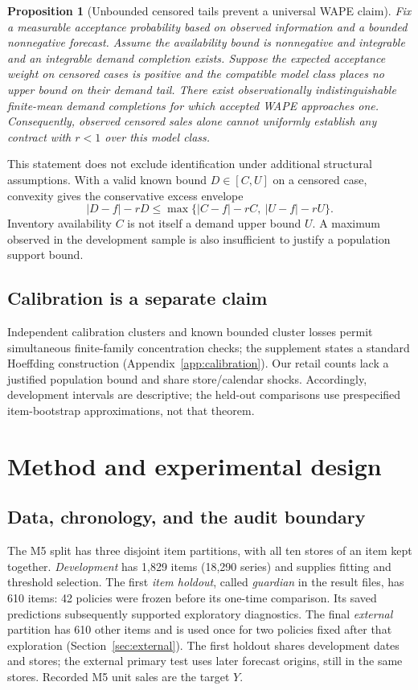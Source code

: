 \documentclass{article}
\newtheorem{proposition}{Proposition}
\begin{document}
\begin{proposition}[Unbounded censored tails prevent a universal WAPE claim]
\label{prop:identification}
Fix a measurable acceptance probability based on observed information and a bounded nonnegative forecast. Assume the availability bound is nonnegative and integrable and an integrable demand completion exists. Suppose the expected acceptance weight on censored cases is positive and the compatible model class places no upper bound on their demand tail. There exist observationally indistinguishable finite-mean demand completions for which accepted WAPE approaches one. Consequently, observed censored sales alone cannot uniformly establish any contract with $r<1$ over this model class.
\end{proposition}
This statement does not exclude identification under additional structural assumptions. With a valid known bound $D\in[C,U]$ on a censored case, convexity gives the conservative excess envelope
\begin{equation}
 |D-f|-rD \leq
 \max\{|C-f|-rC,\ |U-f|-rU\}.
 \label{eq:envelope}
\end{equation}
Inventory availability $C$ is not itself a demand upper bound $U$. A maximum observed in the development sample is also insufficient to justify a population support bound.

\subsection{Calibration is a separate claim}
\label{sec:calibration}
Independent calibration clusters and known bounded cluster losses permit simultaneous finite-family concentration checks; the supplement states a standard Hoeffding construction (Appendix~\ref{app:calibration}). Our retail counts lack a justified population bound and share store/calendar shocks. Accordingly, development intervals are descriptive; the held-out comparisons use prespecified item-bootstrap approximations, not that theorem.

\section{Method and experimental design}
\subsection{Data, chronology, and the audit boundary}
The M5 split has three disjoint item partitions, with all ten stores of an item kept together. \emph{Development} has 1,829 items (18,290 series) and supplies fitting and threshold selection. The first \emph{item holdout}, called \emph{guardian} in the result files, has 610 items: 42 policies were frozen before its one-time comparison. Its saved predictions subsequently supported exploratory diagnostics. The final \emph{external} partition has 610 other items and is used once for two policies fixed after that exploration (Section~\ref{sec:external}). The first holdout shares development dates and stores; the external primary test uses later forecast origins, still in the same stores. Recorded M5 unit sales are the target $Y$.
\end{document}
